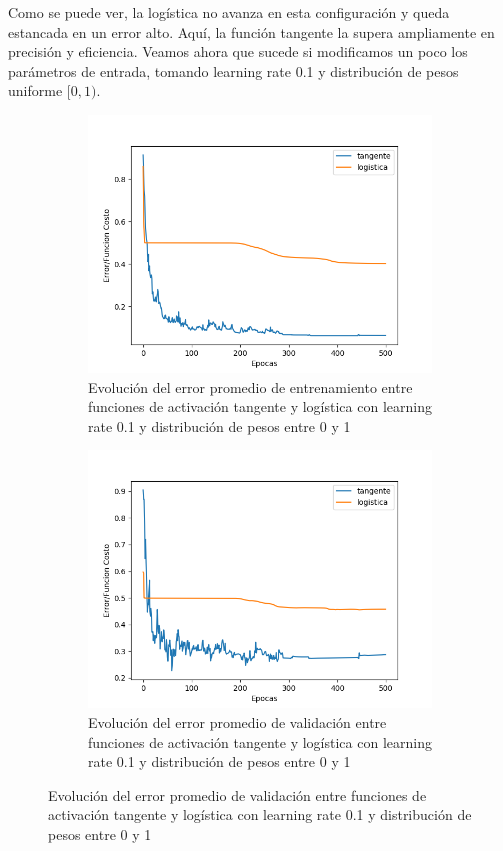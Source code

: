 Como se puede ver, la logística no avanza en esta configuración y queda estancada en un error alto. Aquí, la función
 tangente la supera ampliamente en precisión y eficiencia. Veamos ahora que sucede si modificamos un poco los parámetros de entrada, 
 tomando learning rate 0.1 y distribución de pesos uniforme $[0, 1)$. 

\begin{figure}[!htbp]
\centering
\begin{subfigure}{.5\textwidth}
  \centering
  \includegraphics[width=1\linewidth]{graficos/factivaciones_promedios_entrenamiento_uniforme.png}
  \caption{Evolución del error promedio de entrenamiento entre funciones de activación tangente y logística con learning rate 0.1 y distribución de pesos entre 0 y 1}
  \label{fig:sub1}
\end{subfigure}%
\begin{subfigure}{.5\textwidth}
  \centering
  \includegraphics[width=1\linewidth]{graficos/factivaciones_promedios_validacion_uniforme.png}
  \caption{Evolución del error promedio de validación entre funciones de activación tangente y logística con learning rate 0.1 y distribución de pesos entre 0 y 1}
  \label{fig:sub2}
\end{subfigure}
\end{figure}

